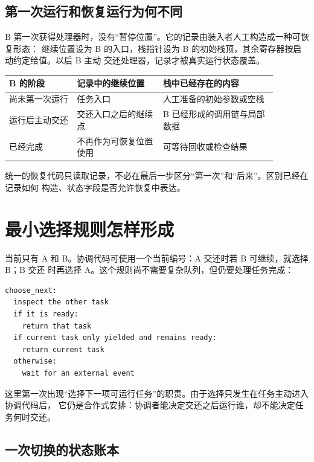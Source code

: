 \subsection{第一次运行和恢复运行为何不同}

B 第一次获得处理器时，没有“暂停位置”。它的记录由装入者人工构造成一种可恢复形态：
继续位置设为 B 的入口，栈指针设为 B 的初始栈顶，其余寄存器按启动约定给值。以后 B 主动
交还处理器，记录才被真实运行状态覆盖。

\begin{longtable}{|L{0.22\linewidth}|L{0.29\linewidth}|L{0.37\linewidth}|}
\hline
{}
B 的阶段 & 记录中的继续位置 & 栈中已经存在的内容 \\ \hline
尚未第一次运行 & 任务入口 & 人工准备的初始参数或空栈 \\ \hline
运行后主动交还 & 交还入口之后的继续点 & B 已经形成的调用链与局部数据 \\ \hline
已经完成 & 不再作为可恢复位置使用 & 可等待回收或检查结果 \\ \hline
\end{longtable}

统一的恢复代码只读取记录，不必在最后一步区分“第一次”和“后来”。区别已经在记录如何
构造、状态字段是否允许恢复中表达。

\section{最小选择规则怎样形成}

当前只有 A 和 B。协调代码可使用一个当前编号：A 交还时若 B 可继续，就选择 B；B 交还
时再选择 A。这个规则尚不需要复杂队列，但仍要处理任务完成：

\begin{lstlisting}
choose_next:
  inspect the other task
  if it is ready:
    return that task
  if current task only yielded and remains ready:
    return current task
  otherwise:
    wait for an external event
\end{lstlisting}

这里第一次出现“选择下一项可运行任务”的职责。由于选择只发生在任务主动进入协调代码后，
它仍是合作式安排：协调者能决定交还之后运行谁，却不能决定任务何时交还。

\subsection{一次切换的状态账本}

